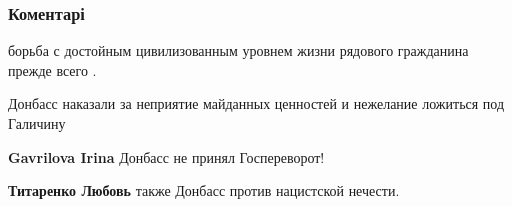  
 
 
 
 
\subsubsection{Коментарі}
\label{sec:02_08_2021.fb.zharkih_denis.1.donbass_nakazanie.cmt}

\begin{itemize}
 
борьба с достойным цивилизованным уровнем жизни рядового гражданина прежде всего .

 
Донбасс наказали за неприятие майданных ценностей и нежелание ложиться под Галичину

\begin{itemize}
 
\textbf{Gavrilova Irina} Донбасс не принял Госпереворот!

 
\textbf{Титаренко Любовь} также Донбасс против нацистской нечести.

 

\end{itemize}
\end{itemize}
